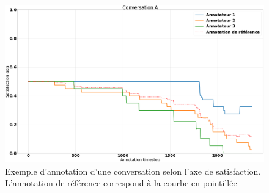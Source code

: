 \begin{figure}[h]
  \centering
  \includegraphics[width=15cm]{./Chapitre4/figures/annotTroisGold.png}
  \caption{Exemple d'annotation d'une conversation selon l'axe de satisfaction. L'annotation de référence correspond à la courbe en pointillée}
  \label{fig:annotTroisGold}
\end{figure}

